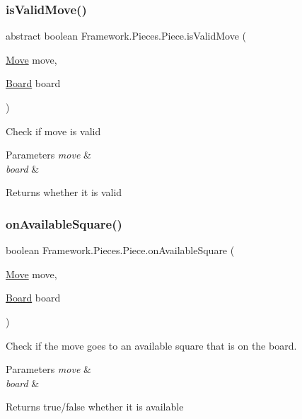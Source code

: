 \subsubsection{\texorpdfstring{is\+Valid\+Move()}{isValidMove()}}
{\footnotesize\ttfamily abstract boolean Framework.\+Pieces.\+Piece.\+is\+Valid\+Move (\begin{DoxyParamCaption}\item[{\hyperlink{class_framework_1_1_move}{Move}}]{move,  }\item[{\hyperlink{class_framework_1_1_board}{Board}}]{board }\end{DoxyParamCaption})\hspace{0.3cm}{\ttfamily [abstract]}}

Check if move is valid


\begin{DoxyParams}{Parameters}
{\em move} & \\
\hline
{\em board} & \\
\hline
\end{DoxyParams}
\begin{DoxyReturn}{Returns}
whether it is valid 
\end{DoxyReturn}
\hypertarget{class_framework_1_1_pieces_1_1_piece_a37f5106b3aae8a2b13857f6ce6bec328}{}\label{class_framework_1_1_pieces_1_1_piece_a37f5106b3aae8a2b13857f6ce6bec328} 
\subsubsection{\texorpdfstring{on\+Available\+Square()}{onAvailableSquare()}}
{\footnotesize\ttfamily boolean Framework.\+Pieces.\+Piece.\+on\+Available\+Square (\begin{DoxyParamCaption}\item[{\hyperlink{class_framework_1_1_move}{Move}}]{move,  }\item[{\hyperlink{class_framework_1_1_board}{Board}}]{board }\end{DoxyParamCaption})}

Check if the move goes to an available square that is on the board. 
\begin{DoxyParams}{Parameters}
{\em move} & \\
\hline
{\em board} & \\
\hline
\end{DoxyParams}
\begin{DoxyReturn}{Returns}
true/false whether it is available 
\end{DoxyReturn}
\hypertarget{class_framework_1_1_pieces_1_1_piece_a62edc25d1604d7103c8f69ffe35700bd}{}\label{class_framework_1_1_pieces_1_1_piece_a62edc25d1604d7103c8f69ffe35700bd} 
